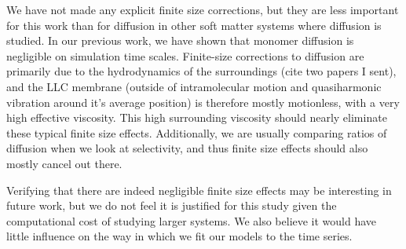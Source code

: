 \documentclass{article}
\begin{document}
\begin{enumerate}[label={Comment \theenumi :}, leftmargin=3.9\parindent]



        We have not made any explicit finite size corrections, but
        they are less important for this work than for diffusion in
        other soft matter systems where diffusion is studied. In our
        previous work, we have shown that monomer diffusion is
        negligible on simulation time scales. Finite-size corrections
        to diffusion are primarily due to the hydrodynamics of the surroundings (cite two
        papers I sent), and the LLC membrane (outside of
        intramolecular motion and quasiharmonic vibration around it's
        average position) is therefore mostly motionless, with a very
        high effective viscosity.  This high surrounding viscosity
        should nearly eliminate these typical finite size effects.
        Additionally, we are usually comparing ratios of diffusion
        when we look at selectivity, and thus finite size effects
        should also mostly cancel out there.

        Verifying that there are indeed negligible finite size effects
        may be interesting in future work, but we do not feel it is
        justified for this study given the computational cost of
        studying larger systems. We also believe it would have little
        influence on the way in which we fit our models to the time
        series.

        


\end{enumerate}
\end{document}
